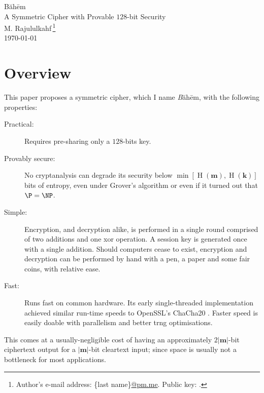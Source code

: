 \documentclass[twocolumn,hidelinks]{article}
\newcommand{\baheem}{Băhēm}
\DeclareMathOperator{\entropy}{H}
\begin{document}
\begin{center}
    \Huge
    \baheem\\
    \LARGE
    A Symmetric Cipher with Provable $128$-bit Security\\
    \normalsize
    \vspace{0.5em}
    M. Rajululkahf\,\footnote{Author's
    e-mail address: \{last name\}\url{@pm.me}.  Public key: .}\\
    \vspace{0.5em}
    \footnotesize
    \today
\end{center}

\section*{Overview}
This paper proposes a symmetric cipher, which I name \emph\baheem, with the
following properties:
\begin{description}
    \item[Practical:]  Requires pre-sharing only a $128$-bits key.

    \item[Provably secure:]  No cryptanalysis can degrade its security
        below $\min[\entropy(\mathbf{m}), \entropy(\mathbf{k})]$ bits of
        entropy, even under Grover's algorithm \cite{10.1145/237814.237866}
        or even if it turned out that $\P = \NP$.

    \item[Simple:]  Encryption, and decryption alike, is performed in a
        single round comprised of two additions and one \gls{xor}
        operation.  A session key is generated once with a single addition.
        Should computers cease to exist, encryption and decryption can be
        performed by hand with a pen, a paper and some fair coins, with
        relative ease.

    \item[Fast:]  Runs fast on common hardware.  Its early single-threaded
        implementation achieved similar run-time speeds to OpenSSL's
        ChaCha20 \cite{chacha20}. Faster speed is easily doable with
        parallelism and better \gls{trng} optimisations.
\end{description}

This comes at a usually-negligible cost of having an approximately
$2|\mathbf{m}|$-bit ciphertext output for a $|\mathbf{m}|$-bit cleartext
input; since space is usually not a bottleneck for most applications. 
\end{document}

